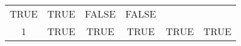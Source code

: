 \documentclass[]{article}
\begin{document}
\begin{longtable}[c]{@{}cccccc@{}}
\begin{minipage}[t]{0.14\columnwidth}
TRUE
\strut\end{minipage} &
\begin{minipage}[t]{0.14\columnwidth}\centering\strut
TRUE
\strut\end{minipage} &
\begin{minipage}[t]{0.14\columnwidth}\centering\strut
FALSE
\strut\end{minipage} &
\begin{minipage}[t]{0.14\columnwidth}\centering\strut
FALSE
\strut\end{minipage}\tabularnewline
\begin{minipage}[t]{0.08\columnwidth}\centering\strut
1
\strut\end{minipage} &
\begin{minipage}[t]{0.14\columnwidth}\centering\strut
TRUE
\strut\end{minipage} &
\begin{minipage}[t]{0.14\columnwidth}\centering\strut
TRUE
\strut\end{minipage} &
\begin{minipage}[t]{0.14\columnwidth}\centering\strut
TRUE
\strut\end{minipage} &
\begin{minipage}[t]{0.14\columnwidth}\centering\strut
TRUE
\strut\end{minipage} &
\begin{minipage}[t]{0.14\columnwidth}\centering\strut
TRUE
\strut\end{minipage}\tabularnewline
\bottomrule
\end{longtable}
\end{document}

